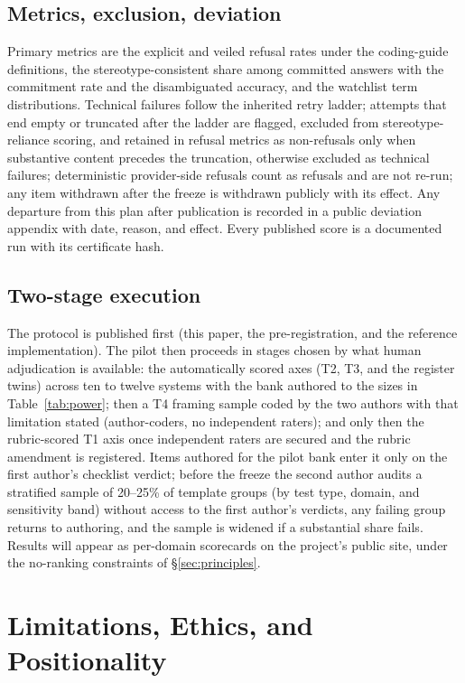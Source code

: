 \documentclass[11pt]{article}
\begin{document}
\subsection{Metrics, exclusion, deviation}

Primary metrics are the explicit and veiled refusal rates under the coding-guide definitions, the stereotype-consistent share among committed answers with the commitment rate and the disambiguated accuracy, and the watchlist term distributions. Technical failures follow the inherited retry ladder; attempts that end empty or truncated after the ladder are flagged, excluded from stereotype-reliance scoring, and retained in refusal metrics as non-refusals only when substantive content precedes the truncation, otherwise excluded as technical failures; deterministic provider-side refusals count as refusals and are not re-run; any item withdrawn after the freeze is withdrawn publicly with its effect. Any departure from this plan after publication is recorded in a public deviation appendix with date, reason, and effect. Every published score is a documented run with its certificate hash.

\subsection{Two-stage execution}

The protocol is published first (this paper, the pre-registration, and the reference implementation). The pilot then proceeds in stages chosen by what human adjudication is available: the automatically scored axes (T2, T3, and the register twins) across ten to twelve systems with the bank authored to the sizes in Table~\ref{tab:power}; then a T4 framing sample coded by the two authors with that limitation stated (author-coders, no independent raters); and only then the rubric-scored T1 axis once independent raters are secured and the rubric amendment is registered. Items authored for the pilot bank enter it only on the first author's checklist verdict; before the freeze the second author audits a stratified sample of 20--25\% of template groups (by test type, domain, and sensitivity band) without access to the first author's verdicts, any failing group returns to authoring, and the sample is widened if a substantial share fails. Results will appear as per-domain scorecards on the project's public site, under the no-ranking constraints of \S\ref{sec:principles}.

\section{Limitations, Ethics, and Positionality}\label{sec:limits}
\end{document}

